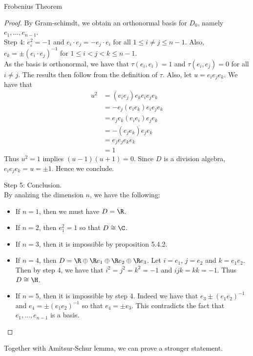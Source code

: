 \documentclass[a4paper]{article}
\begin{document}
\begin{thm}{Frobenius Theorem}{}
\begin{proof}
By Gram-schimdt, we obtain an orthonormal basis for $D_0$, namely $e_1,\dots,e_{n-1}$. \\

Step 4: $e_i^2=-1$ and $e_i\cdot e_j=-e_j\cdot e_i$ for all $1\leq i\neq j\leq n-1$. Also, $e_k=\pm(e_i\cdot e_j)^{-1}$ for $1\leq i<j<k\leq n-1$. \\
As the basis is orthonormal, we have that $\tau(e_i,e_i)=1$ and $\tau(e_i,e_j)=0$ for all $i\neq j$. The results then follow from the definition of $\tau$. Also, let $u=e_ie_je_k$. We have that 
\begin{align*}
u^2&=(e_ie_j)e_ke_ie_je_k\\
&=-e_j(e_ie_k)e_ie_je_k\\
&=e_je_k(e_ie_i)e_je_k\\
&=-(e_je_k)e_je_k\\
&=e_je_je_ke_k\\
&=1
\end{align*}
Thus $u^2=1$ implies $(u-1)(u+1)=0$. Since $D$ is a division algebra, $e_ie_je_k=u=\pm1$. Hence we conclude. 

Step 5: Conclusion. \\
By analzing the dimension $n$, we have the following: 
\begin{itemize}
\item If $n=1$, then we must have $D=\R$. 
\item If $n=2$, then $e_1^2=1$ so that $D\cong\C$. 
\item If $n=3$, then it is impossible by proposition 5.4.2. 
\item If $n=4$, then $D=\R\oplus\R e_1\oplus\R e_2\oplus\R e_3$. Let $i=e_1$, $j=e_2$ and $k=e_1e_2$. Then by step 4, we have that $i^2=j^2=k^2=-1$ and $ijk=kk=-1$. Thus $D\cong\H$. 
\item If $n=5$, then it is impossible by step 4. Indeed we have that $e_3\pm(e_1e_2)^{-1}$ and $e_4=\pm(e_1e_2)^{-1}$ so that $e_4=\pm e_3$. This contradicts the fact that $e_1,\dots,e_{n-1}$ is a basis. 
\end{itemize}
\end{proof}
\end{thm}

Together with Amitsur-Schur lemma, we can prove a stronger statement. 
\end{document}
